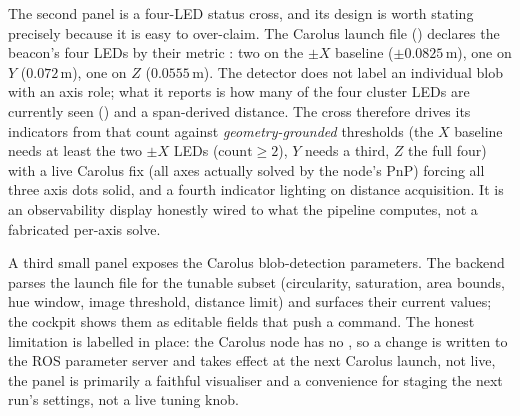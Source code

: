 The second panel is a four-LED status cross, and its design is worth stating
precisely because it is easy to over-claim. The Carolus launch file
() declares the beacon's four LEDs by their
metric : two on the $\pm X$ baseline
($\pm 0.0825$\,m), one on $Y$ ($0.072$\,m), one on $Z$ ($0.0555$\,m). The
detector does not label an individual blob with an axis role; what it
reports is how many of the four cluster LEDs are currently seen
() and a span-derived distance. The cross
therefore drives its indicators from that count against
\emph{geometry-grounded} thresholds (the $X$ baseline needs at least the
two $\pm X$ LEDs ($\text{count}\ge 2$), $Y$ needs a third, $Z$ the full four) with a live Carolus fix (all axes actually solved by the node's PnP)
forcing all three axis dots solid, and a fourth indicator lighting on
distance acquisition. It is an observability display honestly wired to what
the pipeline computes, not a fabricated per-axis solve.

A third small panel exposes the Carolus blob-detection parameters. The
backend parses the launch file for the tunable subset (circularity,
saturation, area bounds, hue window, image threshold, distance limit) and
surfaces their current values; the cockpit shows them as editable fields
that push a  command. The honest limitation is
labelled in place: the Carolus node has no , so a
change is written to the ROS parameter server and takes effect at the next
Carolus launch, not live, the panel is primarily a faithful visualiser
and a convenience for staging the next run's settings, not a live tuning
knob.

